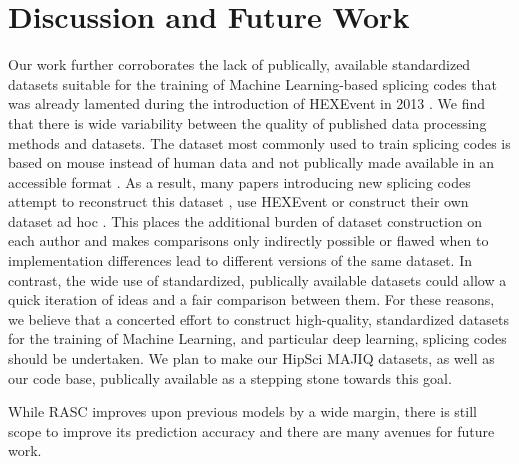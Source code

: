\section{Discussion and Future Work}
Our work further corroborates 
the lack of publically, available standardized datasets suitable for the training of Machine Learning-based splicing codes that was already lamented during the introduction of HEXEvent in 2013 \cite{hexevent}. We find that there is wide variability between the quality of published data processing methods and datasets.
The dataset most commonly used to train splicing codes is based on mouse instead of human data and not publically made available in an accessible format \cite{jha}. As a result, many papers introducing new splicing codes attempt to reconstruct this dataset \cite{d2vsplicing}, use HEXEvent \cite{dsc} or construct their own dataset ad hoc \cite{cossmo}. This places the additional burden of dataset construction on each author and makes comparisons only indirectly possible or flawed when to implementation differences lead to different versions of the same dataset. %
In contrast, the wide use of standardized, publically available datasets could allow a quick iteration of ideas and a fair comparison between them. 
For these reasons, we believe that a concerted effort to construct high-quality, standardized datasets for the training of Machine Learning, and particular deep learning, splicing codes should be undertaken. We plan to make our HipSci MAJIQ datasets, as well as our code base, publically available as a stepping stone towards this goal.


While RASC improves upon previous models by a wide margin, there is still scope to improve its prediction accuracy and there are many avenues for future work. 


